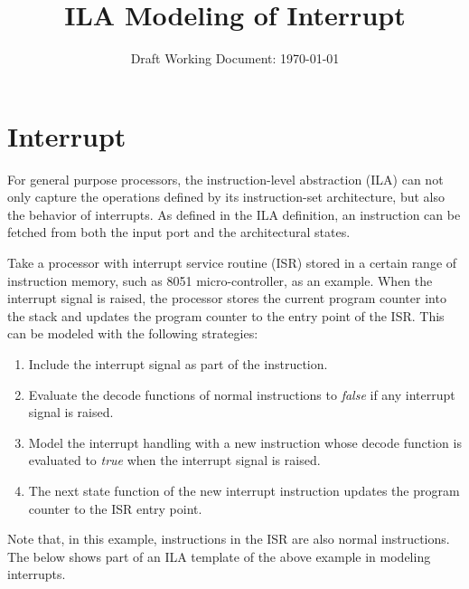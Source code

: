 \documentclass[letterpaper, 11 pt]{article}  %
\title{ILA Modeling of Interrupt}
\author{}
\date{Draft Working Document: \today}
\begin{document}
\maketitle

\providecommand{\bd}[0]{\mathbb{B}}
\providecommand{\st}[1]{\mathrm{#1}}
\providecommand{\ft}[1]{\mathtt{#1}}



\section*{Interrupt}
For general purpose processors, the instruction-level abstraction (ILA) can not 
only capture the operations defined by its instruction-set architecture, but also
the behavior of interrupts.
As defined in the ILA definition, an instruction can be fetched from both the 
input port and the architectural states.

%
Take a processor with interrupt service routine (ISR) stored in a certain range 
of instruction memory, such as 8051 micro-controller, as an example.
When the interrupt signal is raised, the processor stores the current program 
counter into the stack and updates the program counter to the entry point of
the ISR.
This can be modeled with the following strategies:
%
\begin{enumerate}
\item Include the interrupt signal as part of the instruction.
\item Evaluate the decode functions of normal instructions to \textit{false} if 
    any interrupt signal is raised.
\item Model the interrupt handling with a new instruction whose decode 
    function is evaluated to \textit{true} when the interrupt signal is raised.
\item The next state function of the new interrupt instruction updates the 
    program counter to the ISR entry point.
\end{enumerate}

%
Note that, in this example, instructions in the ISR are also normal 
instructions. 
%
The below shows part of an ILA template of the above example in modeling 
interrupts.


%
%
\end{document}
